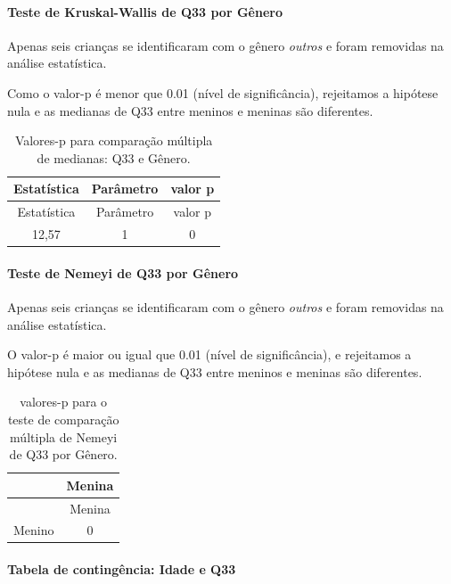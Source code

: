 \documentclass[]{article}
\let\oldparagraph\paragraph
\renewcommand{\paragraph}[1]{\oldparagraph{#1}\mbox{}}
\begin{document}
\hypertarget{teste-de-kruskal-wallis-de-q33-por-guxeanero}{%
\paragraph{Teste de Kruskal-Wallis de Q33 por Gênero}\label{teste-de-kruskal-wallis-de-q33-por-guxeanero}}

Apenas seis crianças se identificaram com o gênero \emph{outros} e foram removidas na análise estatística.

Como o valor-p é menor que 0.01 (nível de significância), rejeitamos a hipótese nula e as medianas de Q33 entre meninos e meninas são diferentes.

\begin{longtable}[]{@{}ccc@{}}
\caption{\label{tab:unnamed-chunk-1151}Valores-p para comparação múltipla de medianas: Q33 e Gênero.}\tabularnewline
\toprule
Estatística & Parâmetro & valor p\tabularnewline
\midrule
\endfirsthead
\toprule
Estatística & Parâmetro & valor p\tabularnewline
\midrule
\endhead
12,57 & 1 & 0\tabularnewline
\bottomrule
\end{longtable}

\hypertarget{teste-de-nemeyi-de-q33-por-guxeanero}{%
\paragraph{Teste de Nemeyi de Q33 por Gênero}\label{teste-de-nemeyi-de-q33-por-guxeanero}}

Apenas seis crianças se identificaram com o gênero \emph{outros} e foram removidas na análise estatística.

O valor-p é maior ou igual que 0.01 (nível de significância), e rejeitamos a hipótese nula e as medianas de Q33 entre meninos e meninas são diferentes.

\begin{longtable}[]{@{}lc@{}}
\caption{\label{tab:unnamed-chunk-1153}valores-p para o teste de comparação múltipla de Nemeyi de Q33 por Gênero.}\tabularnewline
\toprule
& Menina\tabularnewline
\midrule
\endfirsthead
\toprule
& Menina\tabularnewline
\midrule
\endhead
Menino & 0\tabularnewline
\bottomrule
\end{longtable}

\cleardoublepage

\hypertarget{tabela-de-continguxeancia-idade-e-q33}{%
\paragraph{Tabela de contingência: Idade e Q33}\label{tabela-de-continguxeancia-idade-e-q33}}
\end{document}
